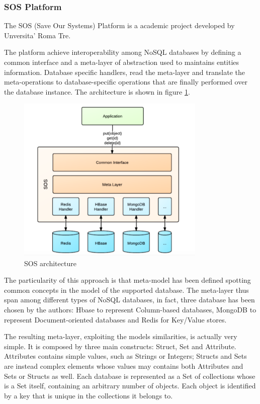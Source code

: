 \subsubsection{SOS Platform}
The SOS (Save Our Systems) Platform \cite{paper:sos-platform} is a academic project developed by Unversita' Roma Tre.

\noindent The platform achieve interoperability among NoSQL databases by defining a common interface  and a meta-layer of abstraction used to maintains entities information. Database specific handlers, read the meta-layer and translate the meta-operations to database-specific operations that are finally performed over the database instance.
The architecture is shown in figure \ref{fig:sos-architecture}.

\begin{figure}[tbh]
  \centering
  \includegraphics[width=9cm]{images/sos_architecture}
  \caption{SOS architecture \cite{paper:sos-platform}}
  \label{fig:sos-architecture}
\end{figure}

\noindent The particularity of this approach is that meta-model has been defined spotting common concepts in the model of the supported database. The meta-layer thus span among different types of NoSQL databases, in fact, three database has been chosen by the authors: Hbase to represent Column-based databases, MongoDB to represent Document-oriented databases and Redis for Key/Value stores. 

\noindent The resulting meta-layer, exploiting the models similarities, is actually very simple. It is composed by three main constructs: Struct, Set and Attribute.
Attributes contains simple values, such as Strings or Integers; Structs and Sets are instead complex elements whose values may contains both Attributes and Sets or Structs as well.
Each database is represented as a Set of collections whose is a Set itself, containing an arbitrary number of objects. Each object is identified by a key that is unique in the collections it belongs to.

